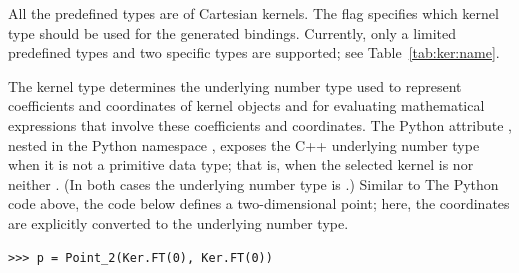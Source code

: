 All the predefined types are of Cartesian kernels. The \cmake{} flag
 specifies which kernel type should be used
for the generated bindings.  Currently, only a limited predefined
types and two specific types are supported; see Table~\ref{tab:ker:name}.

\begin{table}[!htp]
  \caption{Kernel name options.  stands for
    .}
 \centering{}
 \label{tab:ker:name}
\end{table}

The kernel type determines the underlying number type used to
represent coefficients and coordinates of kernel objects and for
evaluating mathematical expressions that involve these coefficients
and coordinates. The Python attribute , nested in the
Python namespace , exposes the C++ underlying number
type when it is not a primitive data type; that is, when the selected
kernel is nor
neither .
(In both cases the underlying number type is .)
Similar to The Python code above, the code below defines a
two-dimensional point; here, the coordinates are explicitly converted
to the underlying number type.
\begin{lstlisting}[style=pythonStyle]
>>> p = Point_2(Ker.FT(0), Ker.FT(0))
\end{lstlisting}

